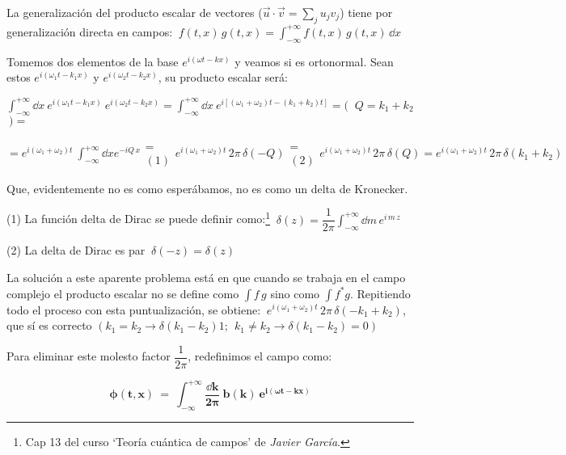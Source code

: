 La generalización del producto escalar de vectores ($\vec u \cdot \vec v = \sum_j u_j v_j$) tiene por generalización directa en campos: $\displaystyle \ f(t,x)\, g(t,x)=\int_{-\infty}^{+\infty} f(t,x)\, g(t,x) \, \dd x$

Tomemos dos elementos de la base $e^{i(\omega t-kx)}$ y veamos si es ortonormal. Sean estos $e^{i(\omega_1 t-k_1x)}$ y $e^{i(\omega_2 t-k_2x)}$, su producto escalar será:

$\displaystyle \int_{-\infty}^{+\infty} \dd x  \ e^{i(\omega_1 t-k_1x)} \ e^{i(\omega_2 t-k_2x)} =  \int_{-\infty}^{+\infty} \dd x  \ e^{i[(\omega_1+\omega_2)t-(k_1+k_2)t]} = ( \ $ \textcolor{gris}{$Q=k_1+k_2$} $ \ ) =$

$\displaystyle = e^{i(\omega_1+\omega_2)t} \  \int_{-\infty}^{+\infty} \dd x e^{-iQ\, x} \begin{matrix} \\ = \\ (1) \end{matrix} e^{i(\omega_1+\omega_2)t}\,  2 \pi \, \delta(-Q) \begin{matrix} \\ = \\ (2) \end{matrix}  e^{i(\omega_1+\omega_2)t}\,  2 \pi \, \delta(Q) = e^{i(\omega_1+\omega_2)t}\,  2 \pi \, \delta(k_1+k_2)$

Que, evidentemente no es como esperábamos, no es como un delta de Kronecker.

\begin{footnotesize}
(1) La función delta de Dirac se puede definir como:\footnote{ Cap 13 del curso `Teoría cuántica de campos' de \emph{Javier García}.} $\ \displaystyle \delta(z)=\dfrac 1{2\pi} \int_{-\infty}^{+\infty} \dd m \, e^{i\, m \, z}$

(2) La delta de Dirac es par $\ \delta(-z)=\delta(z)$	
\end{footnotesize}

La solución a este aparente problema está en que cuando se trabaja en el campo complejo el producto escalar no se define como $\int f\,g$ sino como $\int f^* g$. Repitiendo todo el proceso con esta puntualización, se obtiene:
$\ e^{i(\omega_1+\omega_2)t}\, 2\pi\, \delta(-k_1+k_2)$, que sí es correcto \textcolor{gris}{$(k_1=k_2 \to \delta(k_1-k_2)1;\ \ k_1 \neq k_2 \to \delta(k_1-k_2)=0)$}

Para eliminar este molesto factor $\dfrac 1{2 \pi}$, redefinimos el campo como: 

\begin{equation}
\label{T39SolK-Gctna-redef}
\boldsymbol{
\phi(t,x) \ = \ \int_{-\infty}^{+\infty} \dfrac{\dd k}{2\pi} \ b(k)\ e^{i(\omega t-kx)}
}	
\end{equation}


